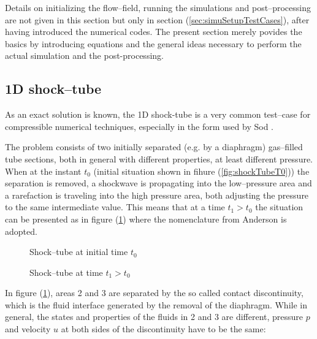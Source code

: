 \documentclass{report}
\begin{document}
Details on initializing the flow--field, running the simulations and post--processing are not given in this section but only in section (\ref{sec:simuSetupTestCases}), after having introduced the numerical codes. The present section merely povides the basics by introducing equations and the general ideas necessary to perform the actual simulation and the post-processing.

\subsection{1D shock--tube}
\label{sec:TestCases_1DshockTube}
As an exact solution is known, the 1D shock-tube is a very common test--case for compressible numerical techniques, especially in the form used by Sod \cite{Sod1978}.

 The problem consists of two initially separated (e.g. by a diaphragm) gas--filled tube sections, both in general with different properties, at least different pressure. When at the instant $t_0$ (initial situation shown in fihure (\ref{fig:shockTubeT0})) the separation is removed, a shockwave is propagating into the low--pressure area and a rarefaction is traveling into the high pressure area, both adjusting the pressure to the same intermediate value. This means that at a time $t_1>t_0$ the situation can be presented as in figure (\ref{fig:shockTubeT1}) where the nomenclature from Anderson \cite{Anderson2002} is adopted.

\begin{figure}[h]
    \centering
            
      \caption{Shock--tube at initial time $t_0$}
      \label{fig:shockTubeT0}
\vspace*{0.3cm}
      
      \caption{Shock--tube at time $t_1>t_0$}
      \label{fig:shockTubeT1}
\end{figure}

In figure (\ref{fig:shockTubeT1}), areas 2 and 3 are separated by the so called contact discontinuity, which is the fluid interface generated by the removal of the diaphragm. While in general, the states and properties of the fluids in 2 and 3 are different, pressure $p$ and velocity $u$ at both sides of the discontinuity have to be the same:
\end{document}
